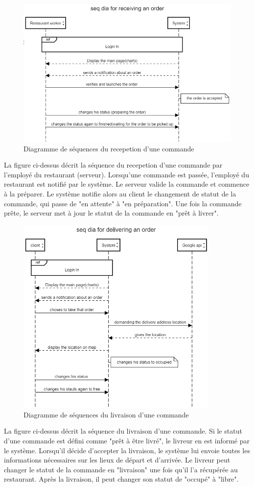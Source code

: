 \documentclass[french, a4paper, 12pt]{report}
\begin{document}
			\newpage	
			\begin{figure}[!h]
  				\center
  				\includegraphics[width=12cm]{seqrest.png}
  				\caption{Diagramme de séquences du recepetion d'une commande}
  				\label{fig:seqrest}
			\end{figure} La figure ci-dessus décrit la séquence du recepetion d'une commande par l'employé du restaurant (serveur). Lorsqu'une commande est passée, l'employé du restaurant est notifié par le système. Le serveur valide la commande et commence à la préparer. Le système notifie alors au client le changement de statut de la commande, qui passe de "en attente" à "en préparation".
Une fois la commande prête, le serveur met à jour le statut de la commande en "prêt à livrer".
			
			\newpage	
			\begin{figure}[!h]
  				\center
  				\includegraphics[width=10cm]{seqdeliver.png}
  				\caption{Diagramme de séquences du livraison d'une commande}
  				\label{fig:seqdeliver}
			\end{figure} La figure ci-dessus décrit la séquence du livraison d'une commande. Si le statut d'une commande est défini comme "prêt à être livré", le livreur en est informé par le système.
Lorsqu'il décide d'accepter la livraison, le système lui envoie toutes les informations nécessaires sur les lieux de départ et d'arrivée.
Le livreur peut changer le statut de la commande en "livraison" une fois qu'il l'a récupérée au restaurant.
Après la livraison, il peut changer son statut de "occupé" à "libre".
\end{document}
